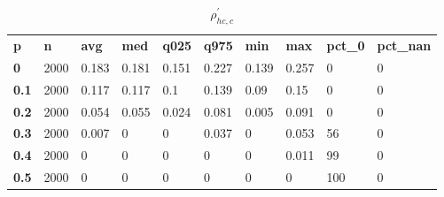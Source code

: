 \begin{table}[h]
 \centering 
\footnotesize
\caption{$\rho_{hc,c}^\prime $}
\label{tab:alphahcc}
\begin{tabular}[h]{| l l l l l l l l l l|
    } \hline
\textbf{ p} & \textbf{ n} & \textbf{ avg} & \textbf{ med} & \textbf{ q025} & \textbf{ q975} & \textbf{ min} & \textbf{ max} & \textbf{ pct\_0} & \textbf{ pct\_nan}
           \\
  \textbf{  0} & 2000 & 0.183 & 0.181 & 0.151 & 0.227 & 0.139 & 0.257 &   0 & 0
           \\
  \textbf{0.1} & 2000 & 0.117 & 0.117 &   0.1 & 0.139 &  0.09 &  0.15 &   0 & 0
           \\
  \textbf{0.2} & 2000 & 0.054 & 0.055 & 0.024 & 0.081 & 0.005 & 0.091 &   0 & 0
           \\
  \textbf{0.3} & 2000 & 0.007 &     0 &     0 & 0.037 &     0 & 0.053 &  56 & 0
           \\
  \textbf{0.4} & 2000 &     0 &     0 &     0 &     0 &     0 & 0.011 &  99 & 0
           \\
  \textbf{0.5} & 2000 &     0 &     0 &     0 &     0 &     0 &     0 & 100 & 0
           \\
 \hline \end{tabular}
 \end{table}
